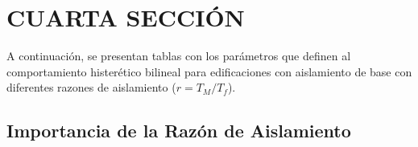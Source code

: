 \section{CUARTA SECCIÓN}

\lipsum[20]

A continuación, se presentan tablas con los parámetros que definen al comportamiento histerético bilineal para edificaciones con aislamiento de base con diferentes razones de aislamiento ($r=T_{M}/T_{f}$). 



	\subsection{Importancia de la Razón de Aislamiento}
	
	\lipsum[29]
	


